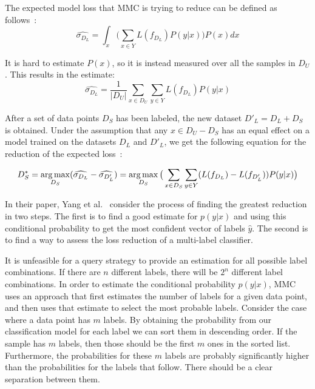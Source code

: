 The expected model loss that MMC is trying to reduce can be defined as follows~\cite{yang2009effective}:
\begin{equation}
    \widehat{\sigma_{D_L}} = \int_x \bigg ( \sum_{x \in Y} L(f_{D_L})P(y|x) \bigg ) P(x)dx
\end{equation}

It is hard to estimate $P(x)$, so it is instead measured over all the samples in $D_U$.
This results in the estimate:
\begin{equation}
    \widehat{\sigma_{D_L}} = \frac{1}{|D_U|} \sum_{x \in D_U} \sum_{y \in Y} L(f_{D_L})P(y|x)
\end{equation}

After a set of data points $D_S$ has been labeled, the new dataset $D'_L=D_L + D_S$ is obtained.
Under the assumption that any $x \in D_U - D_S$ has an equal effect on a model trained on the datasets $D_L$ and $D'_L$, we get the following equation for the reduction of the expected loss~\cite{yang2009effective}:

\begin{equation}
    D^*_S = \operatorname*{arg\,max}_{D_S}(\widehat{\sigma_{D_L}} - \widehat{\sigma_{D'_L}}) = \operatorname*{arg\,max}_{D_S} \big ( \sum_{x \in D_S} \sum_{y \in Y} (L(f_{D_L}) - L(f_{D'_L})) P(y|x) \big )
\end{equation}

In their paper, Yang et al\@.~\cite{yang2009effective} consider the process of finding the greatest reduction in two steps. 
The first is to find a good estimate for $p(y|x)$ and using this conditional probability to get the most confident vector of labels $\hat{y}$. 
The second is to find a way to assess the loss reduction of a multi-label classifier.

It is unfeasible for a query strategy to provide an estimation for all possible label combinations.
If there are $n$ different labels, there will be $2^n$ different label combinations.
In order to estimate the conditional probability $p(y|x)$, MMC uses an approach that first estimates the number of labels for a given data point, and then uses that estimate to select the most probable labels.
Consider the case where a data point has $m$ labels.
By obtaining the probability from our classification model for each label we can sort them in descending order.
If the sample has $m$ labels, then those should be the first $m$ ones in the sorted list.
Furthermore, the probabilities for these $m$ labels are probably significantly higher than the probabilities for the labels that follow.
There should be a clear separation between them.


